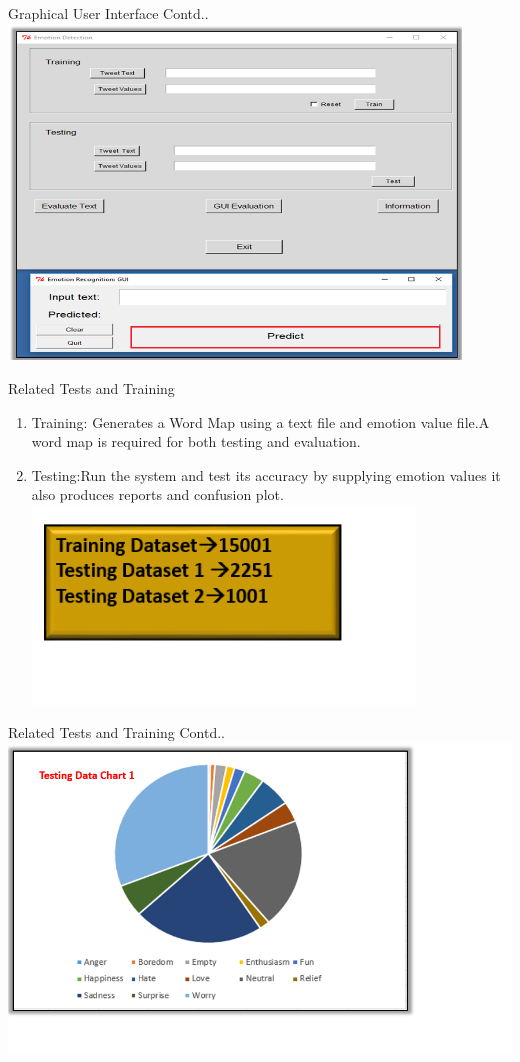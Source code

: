 \documentclass{beamer}
\begin{document}
\begin{frame}{Graphical User Interface Contd..}
\centering
    \includegraphics[width=0.9\textwidth]{Predict.png}
\end {frame}
\begin {frame}{Related Tests and Training}
\begin {enumerate}
\item Training: Generates a Word Map using a text file and emotion value file.A word map is required for both testing and evaluation.\item Testing:Run the system and test its accuracy by supplying emotion values it also produces reports and confusion plot.
    \beginleft
    \includegraphics[width=0.8\textwidth]{Values.PNG}
    \endleft
   \end {enumerate}
\end {frame}
\begin {frame}{Related Tests and Training Contd..}
    \centering
    \includegraphics[width=1.0\textwidth]{2251.PNG}
    \end {frame}
\end{document}
